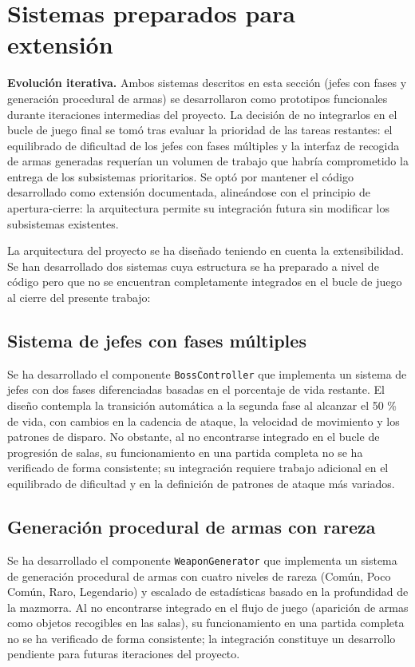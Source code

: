 \section{Sistemas preparados para extensión}


\textbf{Evolución iterativa.} Ambos sistemas descritos en esta sección (jefes con fases y generación procedural de armas) se desarrollaron como prototipos funcionales durante iteraciones intermedias del proyecto. La decisión de no integrarlos en el bucle de juego final se tomó tras evaluar la prioridad de las tareas restantes: el equilibrado de dificultad de los jefes con fases múltiples y la interfaz de recogida de armas generadas requerían un volumen de trabajo que habría comprometido la entrega de los subsistemas prioritarios. Se optó por mantener el código desarrollado como extensión documentada, alineándose con el principio de apertura-cierre: la arquitectura permite su integración futura sin modificar los subsistemas existentes.

La arquitectura del proyecto se ha diseñado teniendo en cuenta la extensibilidad. Se han desarrollado dos sistemas cuya estructura se ha preparado a nivel de código pero que no se encuentran completamente integrados en el bucle de juego al cierre del presente trabajo:

\subsection{Sistema de jefes con fases múltiples}


Se ha desarrollado el componente \texttt{BossController} que implementa un sistema de jefes con dos fases diferenciadas basadas en el porcentaje de vida restante. El diseño contempla la transición automática a la segunda fase al alcanzar el 50 \% de vida, con cambios en la cadencia de ataque, la velocidad de movimiento y los patrones de disparo. No obstante, al no encontrarse integrado en el bucle de progresión de salas, su funcionamiento en una partida completa no se ha verificado de forma consistente; su integración requiere trabajo adicional en el equilibrado de dificultad y en la definición de patrones de ataque más variados.

\subsection{Generación procedural de armas con rareza}


Se ha desarrollado el componente \texttt{WeaponGenerator} que implementa un sistema de generación procedural de armas con cuatro niveles de rareza (Común, Poco Común, Raro, Legendario) y escalado de estadísticas basado en la profundidad de la mazmorra. Al no encontrarse integrado en el flujo de juego (aparición de armas como objetos recogibles en las salas), su funcionamiento en una partida completa no se ha verificado de forma consistente; la integración constituye un desarrollo pendiente para futuras iteraciones del proyecto.

